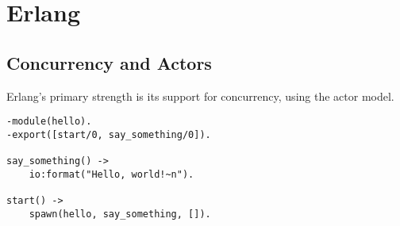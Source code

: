 
\section{Erlang}

\lipsum[5] %

\subsection{Concurrency and Actors}
Erlang's primary strength is its support for concurrency, using the actor model.
\begin{lstlisting}[style=erlangstyle]
-module(hello).
-export([start/0, say_something/0]).

say_something() ->
    io:format("Hello, world!~n").

start() ->
    spawn(hello, say_something, []).
\end{lstlisting}

\lipsum[6]
